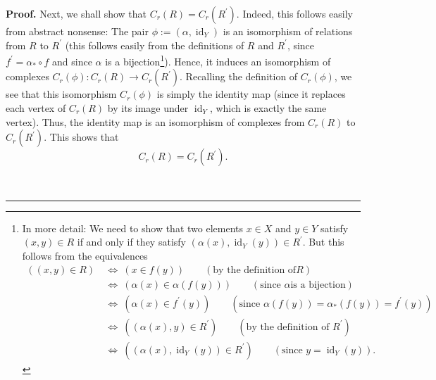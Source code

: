 \documentclass[numbers=enddot,12pt,final,onecolumn,notitlepage]{scrartcl}%
\theoremstyle{definition}
\newenvironment{proof}[1][Proof]{\noindent\textbf{#1.} }{\ \rule{0.5em}{0.5em}}
\begin{document}
\begin{proof}
Next, we shall show that $C_{r}\left(  R\right)  =C_{r}\left(  R^{\prime
}\right)  $. Indeed, this follows easily from abstract nonsense: The pair
$\phi:=\left(  \alpha,\operatorname*{id}\nolimits_{Y}\right)  $ is an
isomorphism of relations from $R$ to $R^{\prime}$ (this follows easily from
the definitions of $R$ and $R^{\prime}$, since $f^{\prime}=\alpha_{\ast}\circ
f$ and since $\alpha$ is a bijection\footnote{In more detail: We need to show
that two elements $x\in X$ and $y\in Y$ satisfy $\left(  x,y\right)  \in R$ if
and only if they satisfy $\left(  \alpha\left(  x\right)  ,\operatorname*{id}%
\nolimits_{Y}\left(  y\right)  \right)  \in R^{\prime}$. But this follows from
the equivalences%
\begin{align*}
\left(  \left(  x,y\right)  \in R\right)  \   & \Longleftrightarrow\ \left(
x\in f\left(  y\right)  \right)  \qquad\left(  \text{by the definition of
}R\right)  \\
& \Longleftrightarrow\ \left(  \alpha\left(  x\right)  \in\alpha\left(
f\left(  y\right)  \right)  \right)  \qquad\left(  \text{since }\alpha\text{
is a bijection}\right)  \\
& \Longleftrightarrow\ \left(  \alpha\left(  x\right)  \in f^{\prime}\left(
y\right)  \right)  \qquad\left(  \text{since }\alpha\left(  f\left(  y\right)
\right)  =\alpha_{\ast}\left(  f\left(  y\right)  \right)  =f^{\prime}\left(
y\right)  \right)  \\
& \Longleftrightarrow\ \left(  \left(  \alpha\left(  x\right)  ,y\right)  \in
R^{\prime}\right)  \qquad\left(  \text{by the definition of }R^{\prime
}\right)  \\
& \Longleftrightarrow\ \left(  \left(  \alpha\left(  x\right)
,\operatorname*{id}\nolimits_{Y}\left(  y\right)  \right)  \in R^{\prime
}\right)  \qquad\left(  \text{since }y=\operatorname*{id}\nolimits_{Y}\left(
y\right)  \right)  .
\end{align*}
}). Hence, it induces an isomorphism of complexes $C_{r}\left(  \phi\right)
:C_{r}\left(  R\right)  \rightarrow C_{r}\left(  R^{\prime}\right)  $.
Recalling the definition of $C_{r}\left(  \phi\right)  $, we see that this
isomorphism $C_{r}\left(  \phi\right)  $ is simply the identity map (since it
replaces each vertex of $C_{r}\left(  R\right)  $ by its image under
$\operatorname*{id}\nolimits_{Y}$, which is exactly the same vertex). Thus,
the identity map is an isomorphism of complexes from $C_{r}\left(  R\right)  $
to $C_{r}\left(  R^{\prime}\right)  $. This shows that
\[
C_{r}\left(  R\right)  =C_{r}\left(  R^{\prime}\right)  .
\]



\end{proof}
\end{document}
